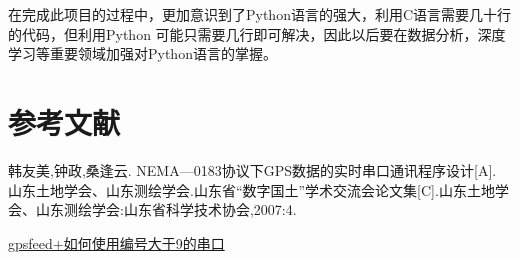 \documentclass[UTF-8, a4paper, 12pt]{ctexart}
\begin{document}
在完成此项目的过程中，更加意识到了Python语言的强大，利用C语言需要几十行的代码，但利用Python
可能只需要几行即可解决，因此以后要在数据分析，深度学习等重要领域加强对Python语言的掌握。

\section{参考文献}

\noindent [1] 韩友美,钟政,桑逢云. NEMA—0183协议下GPS数据的实时串口通讯程序设计[A]. 山东土地学会、山东测绘学会.山东省“数字国土”学术交流会论文集[C].山东土地学会、山东测绘学会:山东省科学技术协会,2007:4.

\noindent [2] \href{https://mp.weixin.qq.com/s/sCODhan6wwRr1mklzY9Uqw}{gpsfeed+如何使用编号大于9的串口}
\end{document}
